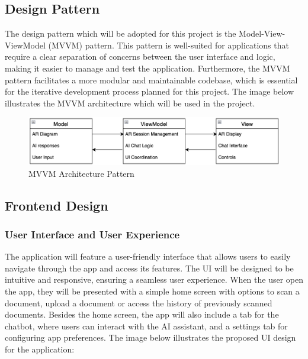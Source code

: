 \documentclass[10pt]{article}
\begin{document}
    \subsection{Design Pattern}

    The design pattern which will be adopted for this project is the Model-View-ViewModel (MVVM) pattern. This pattern is well-suited for applications that require a clear separation
    of concerns between the user interface and logic, making it easier to manage and test the application. Furthermore, the MVVM pattern facilitates a more modular and maintainable
    codebase, which is essential for the iterative development process planned for this project. The image below illustrates the MVVM architecture which will be used in the project.

    \begin{figure}[H]
        \centering
        \includegraphics[width=\textwidth]{img/Pattern.png}
        \caption{MVVM Architecture Pattern}
        \label{fig:Pattern}
    \end{figure}

    \subsection{Frontend Design}

    \subsubsection{User Interface and User Experience}

        The application will feature a user-friendly interface that allows users to easily navigate through the app and access its features. The UI will be designed to be intuitive and responsive, ensuring a seamless user experience. When the user open the app, they will be presented with
        a simple home screen with options to scan a document, upload a document or access the history of previously scanned documents. Besides the home screen, the app will also include a tab for the chatbot, where users can interact with the AI assistant, and a settings tab for configuring
        app preferences. The image below illustrates the proposed UI design for the application:
\end{document}
